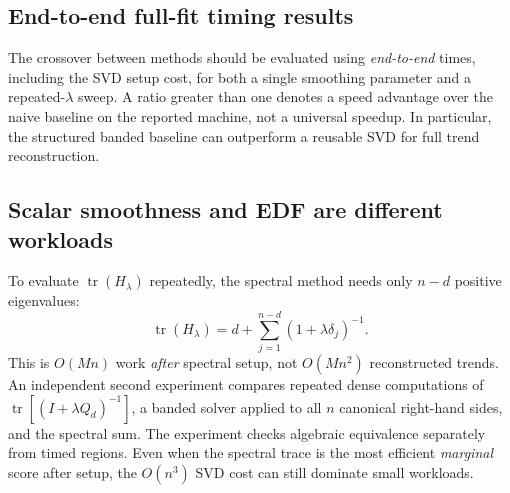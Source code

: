 \subsection{End-to-end full-fit timing results}
The crossover between methods should be evaluated using
\emph{end-to-end} times, including the SVD setup cost, for both
a single smoothing parameter and a repeated-$\lambda$ sweep.
A ratio greater than one denotes a speed advantage over the
naive baseline on the reported machine, not a universal speedup.
In particular, the structured banded baseline can outperform
a reusable SVD for full trend reconstruction.

\subsection{Scalar smoothness and EDF are different workloads}
To evaluate $\operatorname{tr}(H_\lambda)$ repeatedly, the
spectral method needs only $n-d$ positive eigenvalues:
\[
\operatorname{tr}(H_\lambda)
=d+\sum_{j=1}^{n-d}(1+\lambda\delta_j)^{-1}.
\]
This is $O(Mn)$ work \emph{after} spectral setup, not
$O(Mn^2)$ reconstructed trends. An independent second
experiment compares repeated dense computations
of $\operatorname{tr}[(I+\lambda Q_d)^{-1}]$,
a banded solver applied to all $n$ canonical right-hand
sides, and the spectral sum. The experiment checks
algebraic equivalence separately from timed regions.
Even when the spectral trace is the most efficient
\emph{marginal} score after setup, the $O(n^3)$ SVD cost
can still dominate small workloads.


